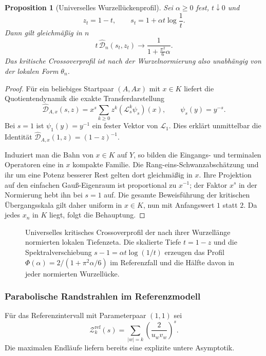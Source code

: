 \documentclass[11pt,a4paper]{article}
\newtheorem{proposition}[remark]{Proposition}
\begin{document}
\begin{proposition}[Universelles Wurzellückenprofil]
Sei $\alpha\ge0$ fest, $t\downarrow0$ und
\[
 z_t=1-t,
 \qquad
 s_t=1+\alpha t\log\frac1t.
\]
Dann gilt gleichmäßig in $n$
\[
 t\,\widehat{\mathscr D}_n(s_t,z_t)
 \longrightarrow
 \frac{1}{1+\frac{\pi^2}{6}\alpha}.
\]
Das kritische Crossoverprofil ist nach der Wurzelnormierung also
unabhängig von der lokalen Form $\theta_n$.
\end{proposition}

\begin{proof}
Für ein beliebiges Startpaar $(A,Ax)$ mit $x\in K$ liefert die
Quotientendynamik die exakte Transferdarstellung
\[
 \widehat{\mathscr D}_{A,x}(s,z)
 =
 x^s\sum_{k\ge0}z^k
 (\mathcal L_s^k\psi_s)(x),
 \qquad
 \psi_s(y)=y^{-s}.
\]
Bei $s=1$ ist $\psi_1(y)=y^{-1}$ ein fester Vektor von
$\mathcal L_1$. Dies erklärt unmittelbar die Identität
$\widehat{\mathscr D}_{A,x}(1,z)=(1-z)^{-1}$.

Induziert man die Bahn von $x\in K$ auf $Y$, so bilden die
Eingangs- und terminalen Operatoren eine in $x$ kompakte Familie. Die
Rang-eins-Schwanzabschätzung und ihr um eine Potenz besserer Rest gelten
dort gleichmäßig in $x$. Ihre Projektion auf den einfachen
Gauß-Eigenraum ist proportional zu $x^{-1}$; der Faktor $x^s$ in der
Normierung hebt ihn bei $s=1$ auf. Die gesamte Beweisführung der
kritischen Übergangsskala gilt daher uniform in $x\in K$, nun mit
Anfangswert $1$ statt $2$. Da jedes $x_n$ in $K$ liegt, folgt die
Behauptung.
\end{proof}

\begin{figure}[htbp]
 \centering
 
 \caption{Universelles kritisches Crossoverprofil der nach ihrer
 Wurzellänge normierten lokalen Tiefenzeta. Die skalierte Tiefe
 $t=1-z$ und die Spektralverschiebung
 $s-1=\alpha t\log(1/t)$ erzeugen das Profil
 $\Phi(\alpha)=2/(1+\pi^2\alpha/6)$ im Referenzfall und die Hälfte
 davon in jeder normierten Wurzellücke.}
 \label{fig:critical-crossover}
\end{figure}

\subsubsection{Parabolische Randstrahlen im Referenzmodell}

Für das Referenzintervall mit Parameterpaar $(1,1)$ sei
\[
 \mathcal Z_k^{\mathrm{ref}}(s)
 =\sum_{|w|=k}\left(\frac{2}{u_wv_w}\right)^s.
\]
Die maximalen Endläufe liefern bereits eine explizite untere
Asymptotik.
\end{document}
